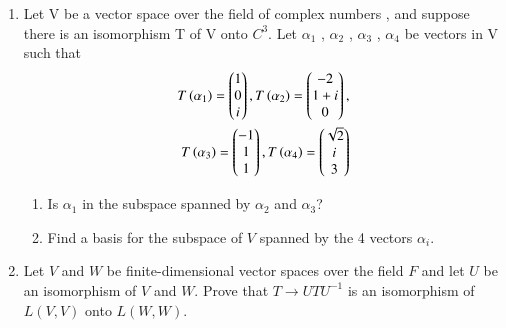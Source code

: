 \renewcommand{\theequation}{\theenumi}
\renewcommand{\thefigure}{\theenumi}
\begin{enumerate}[label=\thesubsection.\arabic*.,ref=\thesubsection.\theenumi]
%
\item Let V be a vector space over the field of complex numbers , and suppose there is an isomorphism T of V onto $C^{3}$. Let $\alpha_1$ , $\alpha_2$ , $\alpha_3$  , $\alpha_4$ be vectors in V such that 
   \begin{multline}
    \begin{aligned}
    T\left(\alpha_1\right)=\begin{pmatrix}1\\0\\i\end{pmatrix} , T\left(\alpha_2\right)=\begin{pmatrix}-2\\1+i\\0\end{pmatrix} ,\\ T\left(\alpha_3\right)=\begin{pmatrix}-1\\1\\1\end{pmatrix} , T\left(\alpha_4\right)=\begin{pmatrix}\sqrt{2}\\i\\3\end{pmatrix}
    \end{aligned}
    \end{multline}
\begin{enumerate}
\item     Is $\alpha_1$ in the subspace spanned by $\alpha_2$ and $\alpha_3$?
\\
%
\solution

\item Find a basis for the subspace of $V$ spanned by the 4 vectors $\alpha_i$.
%
%
%
\\
\solution

\end{enumerate}
\item Let $V$ and $W$ be finite-dimensional vector spaces over the field $F$ and let $U$ be an isomorphism of $V$ and $W$. Prove that $T \rightarrow UTU^{-1}$ is an isomorphism of $L(V,V)$ onto $L(W,W)$.
%
\solution

%
\end{enumerate}
